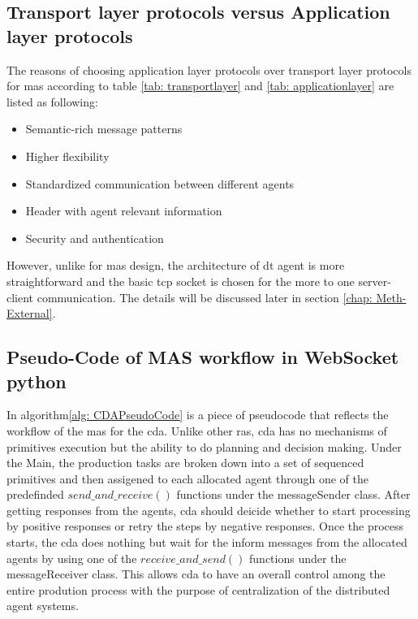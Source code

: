 \subsection{Transport layer protocols versus Application layer protocols}
The reasons of choosing application layer protocols over transport layer protocols for \gls{mas} according to table \ref{tab: transportlayer} and \ref{tab: applicationlayer} are listed as following:
\begin{itemize}
    \item Semantic-rich message patterns
    \item Higher flexibility
    \item Standardized communication between different agents
    \item Header with agent relevant information
    \item Security and authentication
    \end{itemize}
However, unlike for \gls{mas} design, the architecture of \gls{dt} agent is more straightforward and the basic \gls{tcp} socket is chosen for the more to one server-client communication. 
The details will be discussed later in section \ref{chap: Meth-External}.

\subsection{Pseudo-Code of MAS workflow in WebSocket python}
In algorithm\ref{alg: CDAPseudoCode} is a piece of pseudocode that reflects the workflow of the \gls{mas} for the \gls{cda}. 
Unlike other \gls{ras}, \gls{cda} has no mechanisms of primitives execution but the ability to do planning and decision making. 
Under the Main, the production tasks are broken down into a set of sequenced primitives and then assigened to each allocated agent through one of the predefinded $send\_and\_receive()$ functions under the messageSender class.
After getting responses from the agents, \gls{cda} should deicide whether to start processing by positive responses or retry the steps by negative responses.  
Once the process starts, the \gls{cda} does nothing but wait for the inform messages from the allocated agents by using one of the $receive\_and\_send()$ functions under the messageReceiver class. 
This allows \gls{cda} to have an overall control among the entire prodution process with the purpose of centralization of the distributed agent systems.  



